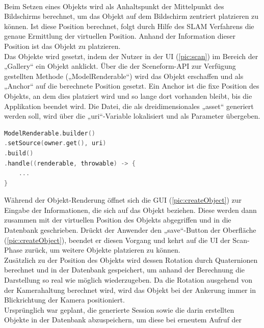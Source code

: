 \\ 
Beim Setzen eines Objekts wird als Anhaltspunkt der Mittelpunkt des Bildschirms berechnet, um das Objekt auf dem Bildschirm zentriert platzieren zu können. Ist 
diese Position berechnet, folgt durch Hilfe des \acs{SLAM} Verfahrens die genaue Ermittlung der virtuellen Position. Anhand der Information dieser Position 
ist das Objekt zu platzieren. 
\\ 
Das Objekte wird gesetzt, indem der Nutzer in der \acs{UI} (\ref{pic:scan}) im Bereich der „Gallery“ ein Objekt anklickt.
Über die der Sceneform-\acs{API} zur Verfügung gestellten Methode („ModelRenderable“) wird das Objekt erschaffen und als „Anchor“ auf die berechnete Position 
gesetzt. Ein Anchor ist die fixe Position des Objekts, an dem dies platziert wird und so lange dort vorhanden bleibt, bis die Applikation beendet wird. Die Datei, 
die als dreidimensionales „asset“ generiert werden soll, wird über die „uri“-Variable lokalisiert und als Parameter übergeben. 
\begin{lstlisting}[language=C,
    frame=lines,           % Ein Rahmen um den Code (single for box, lines for top and bottom)
    xleftmargin=\parindent,  % Rahmen link von den Zahlen
    style=algoBericht,
    label={code:modelrenderable},
    captionpos=b,           % Caption unter den Code setzen
caption={ModelRenderable Builder}]
ModelRenderable.builder()
.setSource(owner.get(), uri)
.build()
.handle((renderable, throwable) -> {
    ...
}
\end{lstlisting}
Während der Objekt-Renderung öffnet sich die \acs{GUI} (\ref{pic:createObject}) zur Eingabe der Informationen, die sich auf das Objekt beziehen. Diese 
werden dann zusammen mit der virtuellen Position des Objekts abgegriffen und in die Datenbank geschrieben. Drückt der Anwender den „save“-Button der Oberfläche 
(\ref{pic:createObject}), beendet er diesen Vorgang und kehrt auf die \acs{UI} der Scan-Phase zurück, um weitere Objekte platzieren zu können. 
\\ 
Zusätzlich zu der Position des Objekts wird dessen Rotation durch Quaternionen berechnet und in der Datenbank gespeichert, um anhand der Berechnung 
die Darstellung so real wie möglich wiederzugeben. Da die Rotation ausgehend von der Kamerahaltung berechnet wird, wird das Objekt bei der Ankerung immer in 
Blickrichtung der Kamera positioniert.
\\ 
\linebreak
Ursprünglich war geplant, die generierte Session sowie die darin erstellten Objekte in der Datenbank abzuspeichern, um diese bei erneutem Aufruf der 
